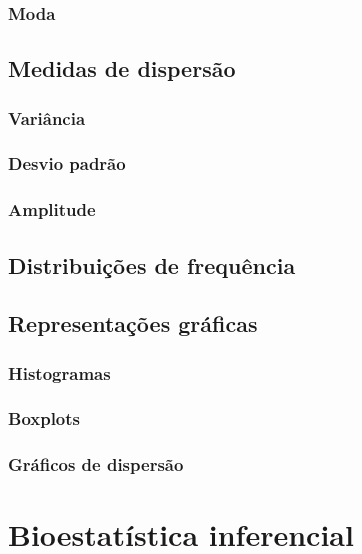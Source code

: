 \documentclass[
]{book}
\begin{document}
\subsection{Moda}\label{moda}

\section{Medidas de dispersão}\label{medidas-de-dispersuxe3o}

\subsection{Variância}\label{variuxe2ncia}

\subsection{Desvio padrão}\label{desvio-padruxe3o}

\subsection{Amplitude}\label{amplitude}

\section{Distribuições de frequência}\label{distribuiuxe7uxf5es-de-frequuxeancia}

\section{Representações gráficas}\label{representauxe7uxf5es-gruxe1ficas}

\subsection{Histogramas}\label{histogramas}

\subsection{Boxplots}\label{boxplots}

\subsection{Gráficos de dispersão}\label{gruxe1ficos-de-dispersuxe3o}

\chapter{Bioestatística inferencial}\label{bioestatuxedstica-inferencial}
\end{document}
